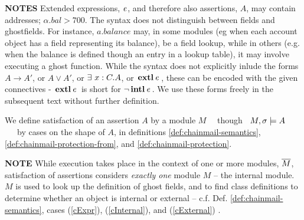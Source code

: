 \noindent
\textbf{NOTES}  \notesep Extended expressions, $\mathit{e}$, and therefore also assertions, $A$, may contain addresses; \eg   $\alpha.bal > 700$. 
\notesep The syntax does  not distinguish between fields and ghostfields. For instance, $a.balance$ may, in some modules (eg when each account object has a field representing its balance), be a field lookup, while in others (e.g. when the balance is defined though an entry in a lookup table),  it may involve executing a ghost function. 
\notesep While the syntax does not explicitly inlude the forms $A\rightarrow A'$, or $A \vee A'$, or ${\exists\ x:C.A}$, or ${\, \mathbf{extl}\, \mathit{e}\, }$, these can be encoded with the given connectives -  ${\, \mathbf{extl}\, \mathit{e}\, }$ is short for $\neg {\ensuremath{\, \mathbf{intl}}\, \mathit{e}\, }$. We use these forms freely in the subsequent text without further definition.


\begin{definition} 
\label{def:chainmail-semantics-all}
\label{def:chainmail-semantics}
We define satisfaction of an assertion $A$ by a %
 module $M$ \ \  though \ $M , \sigma \models {A}$ \ \ \ by cases on the shape of $A$, in definitions \ref{def:chainmail-semantics}, \ref{def:chainmail-protection-from}, and 
 \ref{def:chainmail-protection}.
\end{definition}

\noindent
\textbf{NOTE}  While execution takes place in the context of one or more modules, $\overline{M}$, satisfaction of assertions considers \emph{exactly one} module  $M$ -- the internal module. 
$M$ is used %
 to look up the definition of ghost fields, and to find class definitions to determine whether an object is internal or external
-- c.f. Def. \ref{def:chainmail-semantics}, cases (\ref{cExpr}),  (\ref{cInternal}),  and (\ref{cExternal}) .

